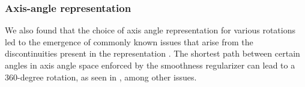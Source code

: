 \subsubsection{Axis-angle representation}
We also found that the choice of axis angle representation for various rotations led to the emergence of commonly known issues that arise from the discontinuities present in the representation \cite{aa_6d_angles}. The shortest path between certain angles in axis angle space enforced by the smoothness regularizer can lead to a 360-degree rotation, as seen in , among other issues.

\begin{figure}[!ht]
    \centering
    \hfil
\end{figure}
